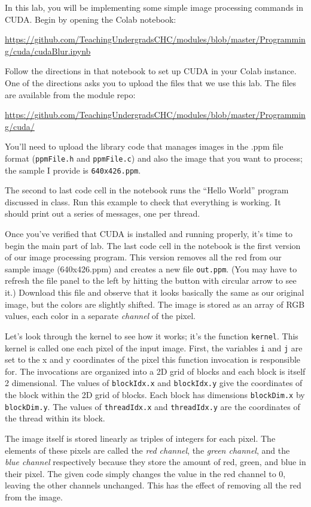 \documentclass{article}
\begin{document}
In this lab, you will be implementing some simple image processing
commands in CUDA.
Begin by opening the Colab notebook:

{\footnotesize \url{https://github.com/TeachingUndergradsCHC/modules/blob/master/Programming/cuda/cudaBlur.ipynb}}

Follow the directions in that notebook to set up CUDA in your Colab
instance.
One of the directions asks you to upload the files that we use this lab.
The files are available from the module repo:

{\footnotesize
  \url{https://github.com/TeachingUndergradsCHC/modules/blob/master/Programming/cuda/}}

You'll need to upload the library code that manages images in the .ppm
file format ({\tt ppmFile.h} and {\tt ppmFile.c}) and also the image
that you want to process; the sample I provide is {\tt 640x426.ppm}.

The second to last code cell in the notebook runs the ``Hello World''
program discussed in class.
Run this example to check that everything is working.
It should print out a series of messages, one per thread.

Once you've verified that CUDA is installed and running properly, it's
time to begin the main part of lab.
The last code cell in the notebook is the first version of our image
processing program.
This version removes all the red from
our sample image (640x426.ppm) and creates a new file
{\tt out.ppm}.
(You may have to refresh the file panel to the left by hitting the
button with circular arrow to see it.)
Download this file and observe that it looks basically the same as our
original image, but the colors are slightly shifted.
The image is stored as an array of RGB values, each color in a
separate {\em channel} of the pixel.

Let's look through the kernel to see how it works; it's the function
{\tt kernel}.
This kernel is called one each pixel of the input image.
First, the variables {\tt i} and {\tt j} are set to the x and y
coordinates of the pixel this function invocation is responsible for.
The invocations are organized into a 2D grid of blocks and each block
is itself 2 dimensional.
The values of {\tt blockIdx.x} and {\tt blockIdx.y} give the
coordinates of the block within the 2D grid of blocks.
Each block has dimensions {\tt blockDim.x} by {\tt blockDim.y}.
The values of {\tt threadIdx.x} and {\tt threadIdx.y} are the
coordinates of the thread within its block.

The image itself is stored linearly as triples of integers for each
pixel.
The elements of these pixels are called the {\em red channel}, the
{\em green channel}, and the {\em blue channel} respectively because
they store the amount of red, green, and blue in their pixel.
The given code simply changes the value in the red channel to 0,
leaving the other channels unchanged.
This has the effect of removing all the red from the image.
\end{document}
